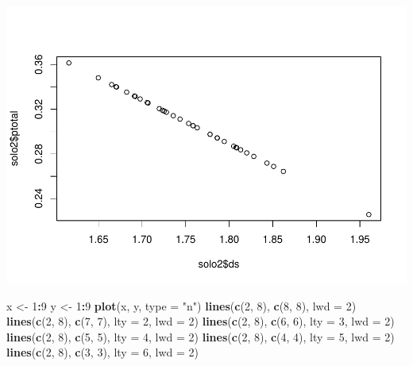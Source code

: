 \documentclass[]{book}
\newenvironment{Shaded}{\begin{snugshade}}{\end{snugshade}}
\newcommand{\DataTypeTok}[1]{\textcolor[rgb]{0.13,0.29,0.53}{#1}}
\newcommand{\DecValTok}[1]{\textcolor[rgb]{0.00,0.00,0.81}{#1}}
\newcommand{\KeywordTok}[1]{\textcolor[rgb]{0.13,0.29,0.53}{\textbf{#1}}}
\newcommand{\NormalTok}[1]{#1}
\newcommand{\OperatorTok}[1]{\textcolor[rgb]{0.81,0.36,0.00}{\textbf{#1}}}
\newcommand{\StringTok}[1]{\textcolor[rgb]{0.31,0.60,0.02}{#1}}
\begin{document}
\includegraphics{TudodoR_files/figure-latex/unnamed-chunk-158-2.pdf}

\begin{Shaded}
\begin{Highlighting}[]
\NormalTok{x <-}\StringTok{ }\DecValTok{1}\OperatorTok{:}\DecValTok{9}
\NormalTok{y <-}\StringTok{ }\DecValTok{1}\OperatorTok{:}\DecValTok{9}
  \KeywordTok{plot}\NormalTok{(x, y, }\DataTypeTok{type =} \StringTok{"n"}\NormalTok{)}
    \KeywordTok{lines}\NormalTok{(}\KeywordTok{c}\NormalTok{(}\DecValTok{2}\NormalTok{, }\DecValTok{8}\NormalTok{), }\KeywordTok{c}\NormalTok{(}\DecValTok{8}\NormalTok{, }\DecValTok{8}\NormalTok{), }\DataTypeTok{lwd =} \DecValTok{2}\NormalTok{)}
    \KeywordTok{lines}\NormalTok{(}\KeywordTok{c}\NormalTok{(}\DecValTok{2}\NormalTok{, }\DecValTok{8}\NormalTok{), }\KeywordTok{c}\NormalTok{(}\DecValTok{7}\NormalTok{, }\DecValTok{7}\NormalTok{), }\DataTypeTok{lty =} \DecValTok{2}\NormalTok{, }\DataTypeTok{lwd =} \DecValTok{2}\NormalTok{)}
    \KeywordTok{lines}\NormalTok{(}\KeywordTok{c}\NormalTok{(}\DecValTok{2}\NormalTok{, }\DecValTok{8}\NormalTok{), }\KeywordTok{c}\NormalTok{(}\DecValTok{6}\NormalTok{, }\DecValTok{6}\NormalTok{), }\DataTypeTok{lty =} \DecValTok{3}\NormalTok{, }\DataTypeTok{lwd =} \DecValTok{2}\NormalTok{)}
    \KeywordTok{lines}\NormalTok{(}\KeywordTok{c}\NormalTok{(}\DecValTok{2}\NormalTok{, }\DecValTok{8}\NormalTok{), }\KeywordTok{c}\NormalTok{(}\DecValTok{5}\NormalTok{, }\DecValTok{5}\NormalTok{), }\DataTypeTok{lty =} \DecValTok{4}\NormalTok{, }\DataTypeTok{lwd =} \DecValTok{2}\NormalTok{)}
    \KeywordTok{lines}\NormalTok{(}\KeywordTok{c}\NormalTok{(}\DecValTok{2}\NormalTok{, }\DecValTok{8}\NormalTok{), }\KeywordTok{c}\NormalTok{(}\DecValTok{4}\NormalTok{, }\DecValTok{4}\NormalTok{), }\DataTypeTok{lty =} \DecValTok{5}\NormalTok{, }\DataTypeTok{lwd =} \DecValTok{2}\NormalTok{)}
    \KeywordTok{lines}\NormalTok{(}\KeywordTok{c}\NormalTok{(}\DecValTok{2}\NormalTok{, }\DecValTok{8}\NormalTok{), }\KeywordTok{c}\NormalTok{(}\DecValTok{3}\NormalTok{, }\DecValTok{3}\NormalTok{), }\DataTypeTok{lty =} \DecValTok{6}\NormalTok{, }\DataTypeTok{lwd =} \DecValTok{2}\NormalTok{)}
\end{Highlighting}
\end{Shaded}
\end{document}
